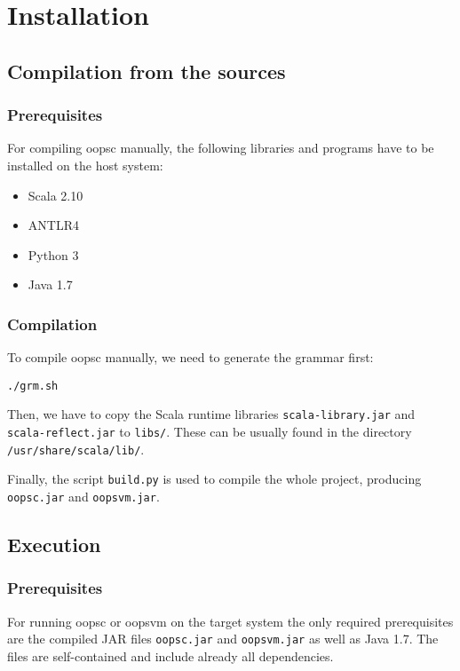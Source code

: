 \documentclass{guide}
\begin{document}
\chapter{Installation}
	\section{Compilation from the sources}
		\subsection{Prerequisites}
		For compiling oopsc manually, the following libraries and programs have to be
		installed on the host system:

		\begin{itemize}
			\item Scala 2.10
			\item ANTLR4
			\item Python 3
			\item Java 1.7
		\end{itemize}

		\subsection{Compilation}
		To compile oopsc manually, we need to generate the grammar first:
\begin{verbatim}
./grm.sh
\end{verbatim}

		Then, we have to copy the Scala runtime libraries \texttt{scala-library.jar}
		and \texttt{scala-reflect.jar} to \texttt{libs/}. These can be usually found
		in the directory \texttt{/usr/share/scala/lib/}.

		Finally, the script \texttt{build.py} is used to compile the whole project,
		producing \texttt{oopsc.jar} and \texttt{oopsvm.jar}.

	\section{Execution}
		\subsection{Prerequisites}
		For running oopsc or oopsvm on the target system the only required
		prerequisites are the compiled JAR files  \texttt{oopsc.jar} and
		\texttt{oopsvm.jar} as well as Java 1.7. The files are self-contained and
		include already all dependencies.
\end{document}
